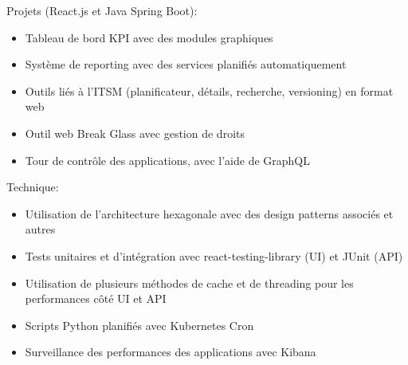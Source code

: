 \documentclass[10.5pt,a4paper,ragged2e,withhyper]{altacv}
\begin{document}


\makecvheader


\vspace{-.5\baselineskip}
\begin{minipage}[t]{0.45\textwidth}
  \vspace{0pt}
  Projets (React.js et Java Spring Boot):
  \begin{itemize}
    \item Tableau de bord KPI avec des modules graphiques
    \item Système de reporting avec des services planifiés automatiquement
    \item Outils liés à l'ITSM (planificateur, détails, recherche, versioning) en format web
    \item Outil web Break Glass avec gestion de droits
    \item Tour de contrôle des applications, avec l'aide de GraphQL
  \end{itemize}
\end{minipage}
\hfill
\begin{minipage}[t]{0.45\textwidth}
  \vspace{0pt}
  Technique:
  \begin{itemize}
    \item Utilisation de l'architecture hexagonale avec des design patterns associés et autres
    \item Tests unitaires et d'intégration avec react-testing-library (UI) et JUnit (API)
    \item Utilisation de plusieurs méthodes de cache et de threading pour les performances côté UI et API
    \item Scripts Python planifiés avec Kubernetes Cron
    \item Surveillance des performances des applications avec Kibana
  \end{itemize}
\end{minipage}
\end{document}
